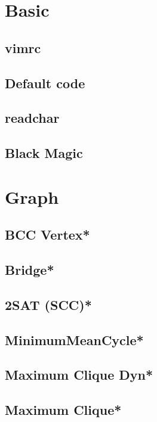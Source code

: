 \section{Basic}
\subsection{vimrc}

\subsection{Default code}

\subsection{readchar}

\subsection{Black Magic}


\section{Graph}
\subsection{BCC Vertex*} %

\subsection{Bridge*} %

\subsection{2SAT (SCC)*} %

\subsection{MinimumMeanCycle*} %

\subsection{Maximum Clique Dyn*} %
 
\subsection{Maximum Clique*} %

